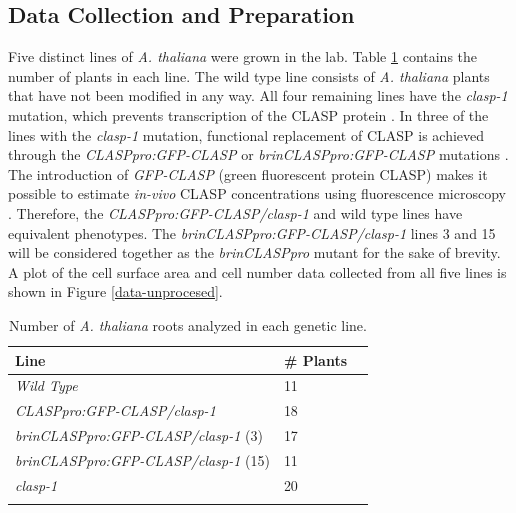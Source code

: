 \documentclass[referee,pdflatex,sn-mathphys-num]{sn-jnl}
\begin{document}
\begin{appendices}

\section{Data Collection and Preparation}\label{secA1}

Five distinct lines of \emph{A. thaliana} were grown in the lab.
Table \ref{plant-lines} contains the number of plants in each line.
The wild type line consists of \emph{A. thaliana} plants that have not been modified in any way.
All four remaining lines have the \emph{clasp-1} mutation, which prevents transcription of the CLASP protein \cite{ambrose2007}.
In three of the lines with the \emph{clasp-1} mutation, functional replacement of CLASP is achieved through the \emph{CLASPpro:GFP-CLASP} or \emph{brinCLASPpro:GFP-CLASP} mutations \cite{ambrose2007, ruan2018}.
The introduction of \emph{GFP-CLASP} (green fluorescent protein CLASP) makes it possible to estimate \emph{in-vivo} CLASP concentrations using fluorescence microscopy \cite{ambrose2007, ruan2018}.
Therefore, the \emph{CLASPpro:GFP-CLASP/clasp-1} and wild type lines have equivalent phenotypes.
The \emph{brinCLASPpro:GFP-CLASP/clasp-1} lines 3 and 15 will be considered together as the \emph{brinCLASPpro} mutant for the sake of brevity.
A plot of the cell surface area and cell number data collected from all five lines is shown in Figure \ref{data-unprocesed}.

\begin{table}[!ht]
\centering
\caption{Number of \emph{A. thaliana} roots analyzed in each genetic line.}
\label{plant-lines}
\begin{tabular}{@{}lll@{}}
\toprule
Line & \# Plants \\
\midrule
\emph{Wild Type}  & 11  \\
\emph{CLASPpro:GFP-CLASP/clasp-1} & 18 \\
\emph{brinCLASPpro:GFP-CLASP/clasp-1} (3) & 17 \\
\emph{brinCLASPpro:GFP-CLASP/clasp-1} (15) & 11 \\
\emph{clasp-1} & 20 \\
\botrule
\end{tabular}
\end{table}


\end{appendices}
\end{document}
